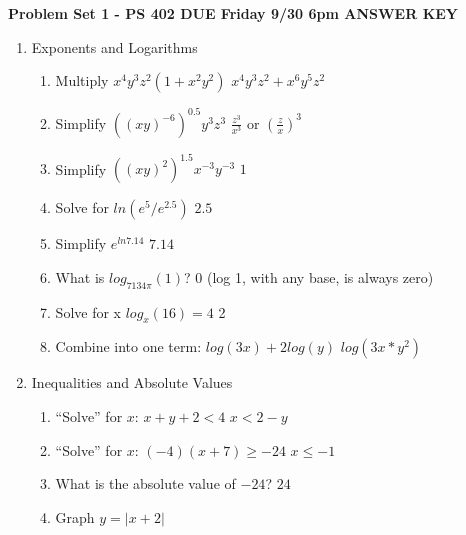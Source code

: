 \documentclass[11pt]{article}
\begin{document}
\noindent \textbf{Problem Set 1 - PS 402 DUE Friday 9/30 6pm \color{gray} ANSWER KEY}

\begin{enumerate}
\item Exponents and Logarithms
\begin{enumerate}
\item Multiply $x^4 y^3 z^2 (1 + x^2 y^2)$ \color{gray} $x^4y^3z^2+x^6y^5z^2$\color{black}
\item Simplify $((xy)^{-6})^{0.5} y^3z^{3}$ \color{gray} $\frac{z^3}{x^3}$ or $(\frac{z}{x})^3$\color{black}
\item Simplify $((xy)^2)^{1.5} x^{-3}y^{-3}$ \color{gray} $1$\color{black}
\item Solve for $ln(e^5/e^{2.5})$ \color{gray}$2.5$\color{black}
\item Simplify $e^{ln 7.14}$ \color{gray} $7.14$\color{black}
\item What is $log_{7134\pi}(1)$? \color{gray}$0$ (log 1, with any base, is always zero)\color{black}
\item Solve for x $log_x(16)=4$ \color{gray}2 \color{black}
\item Combine into one term: $log(3x)+2log(y)$ \color{gray}$log(3x*y^2)$ \color{black}
\end{enumerate}

\item Inequalities and Absolute Values
\begin{enumerate}
\item ``Solve'' for $x$: $x + y +2 < 4$  \color{gray} $x < 2-y$\color{black}
\item ``Solve'' for $x$: $(-4)(x + 7) \geq -24$ \color{gray} $x \leq -1$\color{black}
\item What is the absolute value of $-24$? \color{gray} $24$\color{black}
\item Graph $y = |x +2|$ \color{gray} \color{black}


\vspace{2mm}


\end{enumerate}
\end{enumerate}
\end{document}
